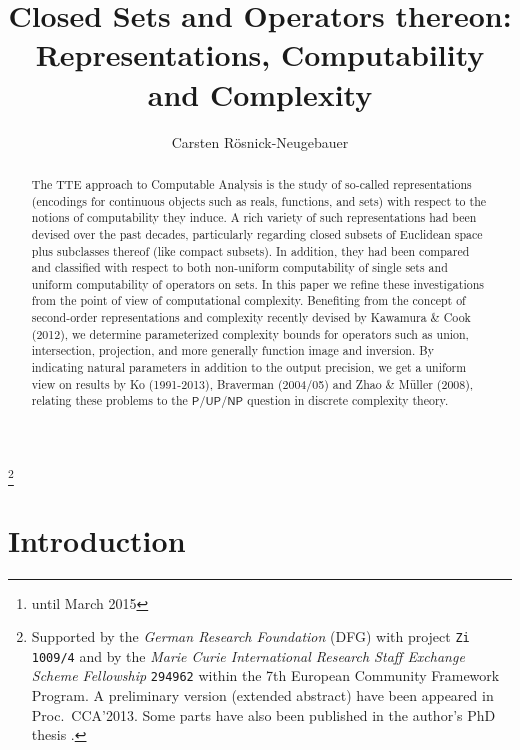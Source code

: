\documentclass{CSML}
\newcommand{\PTime}{\mathsf{P}}
\newcommand{\UPTime}{\mathsf{UP}}
\newcommand{\NPTime}{\mathsf{NP}}
\begin{document}
\title[Closed Sets and Operators thereon]{Closed Sets and Operators thereon:\\%
	Representations, Computability and Complexity}

\author[C.~R\"osnick-Neugebauer]{Carsten R\"osnick-Neugebauer}	%
\address{Technische Universit\"at Darmstadt, Germany\thanks{until March 2015}}	%
\thanks{%
	Supported by the \emph{German Research Foundation} (DFG) with project
	\texttt{Zi\,1009/4} and by the \emph{Marie Curie International Research
	Staff Exchange Scheme Fellowship} \texttt{294962} within the 7th European
	Community Framework Program.
	A preliminary version (extended abstract) have been appeared in Proc.~CCA'2013.
  Some parts have also been published in the author's PhD thesis \cite{crnphdthesis}.
}	%


\begin{abstract}
	The TTE approach to Computable Analysis is the study of so-called
	representations (encodings for continuous objects such as reals, functions,
	and sets) with respect to the notions of computability they induce.
	A rich variety of such representations had been devised over the past
	decades, particularly regarding closed subsets of Euclidean space plus
	subclasses thereof (like compact subsets). In addition, they had been
	compared and classified with respect to both non-uniform computability of
	single sets and uniform computability of operators on sets.
	In this paper we refine these investigations from the point of view of
	computational complexity.
	Benefiting from the concept of second-order representations and complexity
	recently devised by Kawamura \& Cook (2012), we determine parameterized
	complexity bounds for operators such as union, intersection, projection,
	and more generally function image and inversion. By indicating natural
	parameters in addition to the output precision, we get a uniform view on
	results by Ko (1991-2013), Braverman (2004/05) and Zhao \& M\"uller (2008),
	relating these problems to the $\PTime$/$\UPTime$/$\NPTime$ question in
	discrete complexity theory.
\end{abstract}


\maketitle


\section{Introduction}
	\label{sec:intro}
\end{document}
